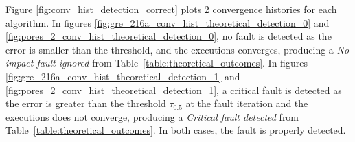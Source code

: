 Figure \ref{fig:conv_hist_detection_correct} plots 2 convergence histories for each algorithm. In figures \ref{fig:gre_216a_conv_hist_theoretical_detection_0} and 
\ref{fig:pores_2_conv_hist_theoretical_detection_0}, no fault is detected as the error is smaller than the threshold, and the executions converges, producing a \emph{No impact fault ignored} from Table~\ref{table:theoretical_outcomes}. In figures \ref{fig:gre_216a_conv_hist_theoretical_detection_1} and 
\ref{fig:pores_2_conv_hist_theoretical_detection_1}, a critical fault is detected as the error is greater than the threshold $\tau_{0.5}$ at the fault iteration and the executions does not converge, producing a \emph{Critical fault detected} from Table~\ref{table:theoretical_outcomes}. In both cases, the fault is properly detected.






